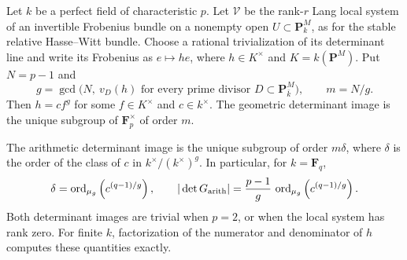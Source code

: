 \begin{proposition}\label{prop:exact-general-determinant-image}
Let $k$ be a perfect field of characteristic $p$.
Let $\mathcal V$ be the rank-$r$ Lang local system of an
invertible Frobenius bundle on a nonempty open
$U\subset\mathbf P^M_k$, as for the stable relative
Hasse--Witt bundle.  Choose a rational trivialization of
its determinant line and write its Frobenius as
$e\mapsto h e$, where
$h\in K^\times$ and $K=k(\mathbf P^M)$.
Put $N=p-1$ and
\begin{equation}\label{eq:det-valuation-gcd}
 g=\gcd\bigl(N,\ v_D(h)\text{ for every prime divisor }
                         D\subset\mathbf P^M_{\bar k}\bigr),
 \qquad m=N/g.
\end{equation}
Then $h=c f^g$ for some $f\in K^\times$ and $c\in k^\times$.
The geometric determinant image is the unique subgroup
of $\mathbf F_p^\times$ of order $m$.

The arithmetic determinant image is the unique subgroup
of order $m\delta$, where
$\delta$ is the order of the class of $c$ in
$k^\times/(k^\times)^g$.  In particular, for
$k=\mathbf F_q$,
\begin{equation}\label{eq:det-arithmetic-explicit}
 \delta=\operatorname{ord}_{\mu_g}
                   \left(c^{(q-1)/g}\right),
 \qquad
 |\det G_{\rm arith}|=\frac{p-1}{g}\,
                   \operatorname{ord}_{\mu_g}
                   \left(c^{(q-1)/g}\right).
\end{equation}
Both determinant images are trivial when $p=2$, or when
the local system has rank zero.
For finite $k$, factorization of the numerator and
denominator of $h$ computes these quantities exactly.
\end{proposition}

